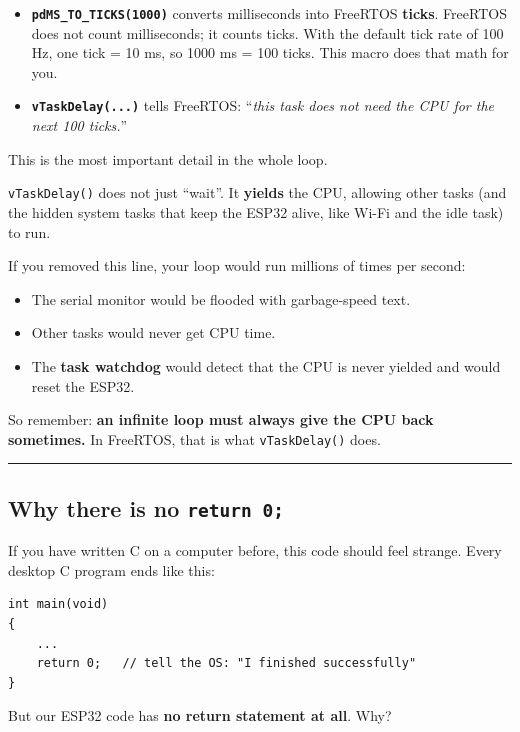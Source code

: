 \documentclass[11pt]{article}
\begin{document}
\begin{itemize}
    \item \textbf{\texttt{pdMS\_TO\_TICKS(1000)}} converts milliseconds into FreeRTOS \textbf{ticks}. FreeRTOS does not count milliseconds; it counts ticks. With the default tick rate of 100 Hz, one tick = 10 ms, so 1000 ms = 100 ticks. This macro does that math for you.
    
    \item \textbf{\texttt{vTaskDelay(...)}} tells FreeRTOS: ``\emph{this task does not need the CPU for the next 100 ticks.}''
\end{itemize}

This is the most important detail in the whole loop.

\texttt{vTaskDelay()} does not just ``wait''. It \textbf{yields} the CPU, allowing other tasks (and the hidden system tasks that keep the ESP32 alive, like Wi-Fi and the idle task) to run.

If you removed this line, your loop would run millions of times per second:

\begin{itemize}
    \item The serial monitor would be flooded with garbage-speed text.
    \item Other tasks would never get CPU time.
    \item The \textbf{task watchdog} would detect that the CPU is never yielded and would reset the ESP32.
\end{itemize}

So remember: \textbf{an infinite loop must always give the CPU back sometimes.} In FreeRTOS, that is what \texttt{vTaskDelay()} does.

\bigskip
\noindent\rule{\textwidth}{0.4pt}
\bigskip

\subsection*{Why there is no \texttt{return 0;}}

If you have written C on a computer before, this code should feel strange. Every desktop C program ends like this:

\begin{verbatim}
int main(void)
{
    ...
    return 0;   // tell the OS: "I finished successfully"
}
\end{verbatim}

But our ESP32 code has \textbf{no return statement at all}. Why?
\end{document}
